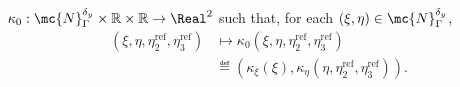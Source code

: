{$
    \kappa_0 : \mc{N}^{\by}_\Gamma\times\reals\times\reals \to \Real^{2}
$
such that, for {\akh each} $(\xi,\eta)\in \mc{N}_\Gamma^{\by}$,
\begin{equation}
\label{eq:kappa_0}
\begin{aligned}
     (\xi,\eta, {\eta}^{\mathrm{ref}}_{2}, \eta^{\mathrm{ref}}_{3}) &\mapsto \kappa_0(\xi,\eta, {\eta}^{\mathrm{ref}}_{2}, \eta^{\mathrm{ref}}_{3})\\
     &\eqdef  (\kappa_\xi(\xi), \kappa_\eta(\eta, {\eta}^{\mathrm{ref}}_{2}, \eta^{\mathrm{ref}}_{3})).
\end{aligned}
\end{equation}


}
